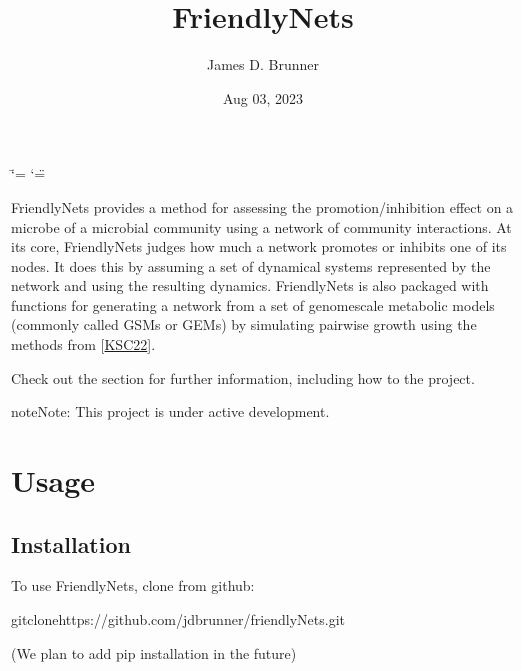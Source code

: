 \documentclass[letterpaper,10pt,english]{sphinxmanual}
\title{FriendlyNets}
\date{Aug 03, 2023}
\author{James D.\@{} Brunner}
\begin{document}
\ifdefined\shorthandoff
  \ifnum\catcode`\=\string=\active\shorthandoff{=}\fi
  \ifnum\catcode`\"=\active{}\fi
\fi

\pagestyle{empty}
\sphinxmaketitle
\pagestyle{plain}
\sphinxtableofcontents
\pagestyle{normal}
\label{\detokenize{index::doc}}


\sphinxAtStartPar
FriendlyNets provides a method for assessing the promotion/inhibition effect on a microbe of a microbial community using a network of community interactions. At its core, FriendlyNets judges how much a network
promotes or inhibits one of its nodes. It does this by assuming a set of dynamical systems represented by the network and using the resulting dynamics. FriendlyNets is also packaged with functions for generating
a network from a set of genome\sphinxhyphen{}scale metabolic models (commonly called GSMs or GEMs) by simulating pairwise growth using the methods from {[}\hyperlink{cite.index:id3}{KSC22}{]}.

\sphinxAtStartPar
Check out the {\hyperref[\detokenize{usage::doc}]{}} section for further information, including how to
{\hyperref[\detokenize{usage:installation}]{}} the project.

\begin{sphinxadmonition}{note}{Note:}
\sphinxAtStartPar
This project is under active development.
\end{sphinxadmonition}

\sphinxstepscope


\chapter{Usage}
\label{\detokenize{usage:usage}}\label{\detokenize{usage::doc}}

\section{Installation}
\label{\detokenize{usage:installation}}\label{\detokenize{usage:id1}}
\sphinxAtStartPar
To use FriendlyNets, clone from github:

\begin{sphinxVerbatim}[commandchars=\\\{\}]
gitclonehttps://github.com/jdbrunner/friendlyNets.git
\end{sphinxVerbatim}

\sphinxAtStartPar
(We plan to add pip installation in the future)
\end{document}
